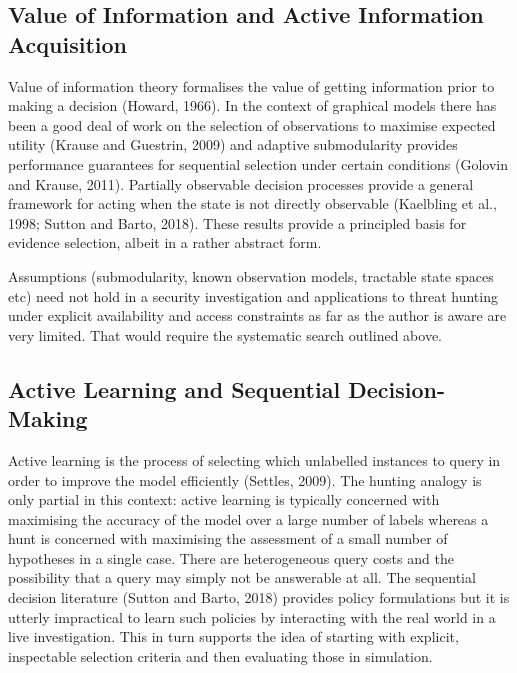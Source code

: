 \documentclass[a4paper,11pt]{article}
\begin{document}
\subsection{Value of Information and Active Information Acquisition}
Value of information theory formalises the value of getting information prior to making a decision (Howard, 1966). In the context of graphical models there has been a good deal of work on the selection of observations to maximise expected utility (Krause and Guestrin, 2009) and adaptive submodularity provides performance guarantees for sequential selection under certain conditions (Golovin and Krause, 2011). Partially observable decision processes provide a general framework for acting when the state is not directly observable (Kaelbling et al., 1998; Sutton and Barto, 2018). These results provide a principled basis for evidence selection, albeit in a rather abstract form.\par
Assumptions (submodularity, known observation models, tractable state spaces etc) need not hold in a security investigation and applications to threat hunting under explicit availability and access constraints as far as the author is aware are very limited. That would require the systematic search outlined above.\par
\subsection{Active Learning and Sequential Decision-Making}
Active learning is the process of selecting which unlabelled instances to query in order to improve the model efficiently (Settles, 2009). The hunting analogy is only partial in this context: active learning is typically concerned with maximising the accuracy of the model over a large number of labels whereas a hunt is concerned with maximising the assessment of a small number of hypotheses in a single case. There are heterogeneous query costs and the possibility that a query may simply not be answerable at all. The sequential decision literature (Sutton and Barto, 2018) provides policy formulations but it is utterly impractical to learn such policies by interacting with the real world in a live investigation. This in turn supports the idea of starting with explicit, inspectable selection criteria and then evaluating those in simulation.\par
\end{document}

